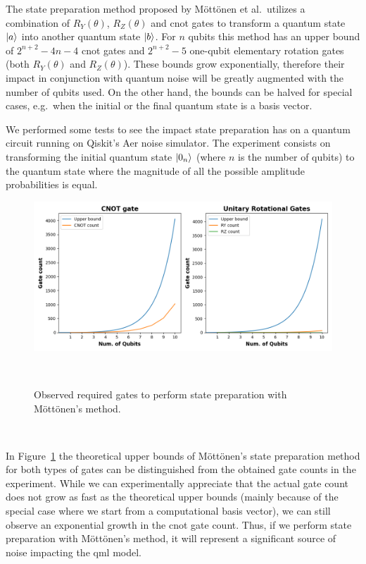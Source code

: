The state preparation method proposed by Möttönen et al.\ utilizes a
combination of \(R_{Y}(\theta)\), \(R_{Z}(\theta)\) and \ac{cnot}
gates to transform a quantum state \(\ket{a}\) into another quantum state
\(\ket{b}\). For \(n\) qubits this method has an upper bound of
\(2^{n+2}-4n-4\) \ac{cnot} gates and \(2^{n+2}-5\) one-qubit elementary
rotation gates (both \(R_{Y}(\theta)\) and \(R_{Z}(\theta)\)). These
bounds grow exponentially, therefore their impact in conjunction with
quantum noise will be greatly augmented with the number of qubits used.
On the other hand, the bounds can be halved for special cases, e.g.\ when
the initial or the final quantum state is a basis vector. \

We performed some tests to see the impact state preparation has on
a quantum circuit running on Qiskit's Aer noise simulator. The experiment
consists on transforming the initial quantum state \(\ket{0_{n}}\)
(where \(n\) is the number of qubits) to the quantum state where the
magnitude of all the possible amplitude probabilities is equal. \

\begin{figure}[h!]
  \includegraphics[scale=0.55]{figures/state-prep-gates-count.png}
  \centering
  \caption{Observed required gates to perform state preparation with Möttönen's method.}
~\label{fig:state_prep}
\end{figure} \

In Figure~\ref{fig:state_prep} the theoretical upper bounds of
Möttönen's state preparation method for both types of gates can
be distinguished from the obtained gate counts in the experiment.
While we can experimentally appreciate that the actual gate count
does not grow as fast as the theoretical upper bounds (mainly because
of the special case where we start from a computational basis vector),
we can still observe an exponential growth in the \ac{cnot} gate count.
Thus, if we perform state preparation with Möttönen's method, it will
represent a significant source of noise impacting the \ac{qml} model. \

